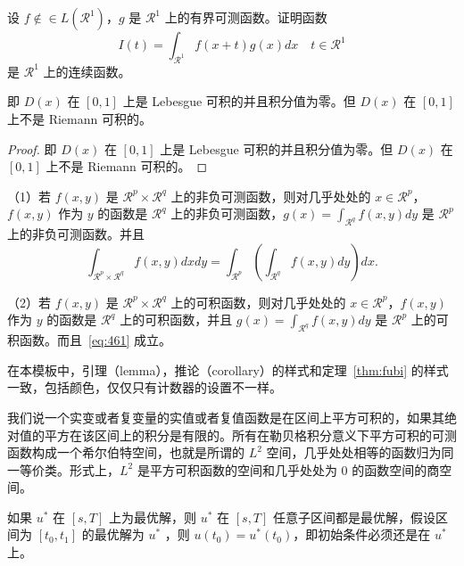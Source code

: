 \documentclass[math,logic,quote,code,mode=simple]{codedumpnote}
\begin{document}
\begin{exercise}\label{exer:43}
设 $f \notin\in L(\mathcal{R}^1)$，$g$ 是 $\mathcal{R}^1$ 上的有界可测函数。证明函数
\begin{equation}
   \label{ex:1}
   I(t) = \int_{\mathcal{R}^1} f(x+t)g(x)dx \quad t \in \mathcal{R}^1
\end{equation}
是 $\mathcal{R}^1$ 上的连续函数。 
\end{exercise}

\begin{solution}
即 $D(x)$ 在 $[0,1]$ 上是 Lebesgue 可积的并且积分值为零。但 $D(x)$ 在 $[0,1]$ 上不是 Riemann 可积的。
\end{solution}

\begin{proof}
即 $D(x)$ 在 $[0,1]$ 上是 Lebesgue 可积的并且积分值为零。但 $D(x)$ 在 $[0,1]$ 上不是 Riemann 可积的。
\end{proof}

\begin{theorem}[Fubini 定理] \label{thm:fubi} 
（1）若 $f(x,y)$ 是 $\mathcal{R}^p\times\mathcal{R}^q$ 上的非负可测函数，则对几乎处处的 $x\in \mathcal{R}^p$，$f(x,y)$ 作为 $y$ 的函数是 $\mathcal{R}^q$ 上的非负可测函数，$g(x)=\int_{\mathcal{R}^q}f(x,y) dy$ 是 $\mathcal{R}^p$ 上的非负可测函数。并且
\begin{equation}
   \label{eq:461}
   \int_{\mathcal{R}^p\times\mathcal{R}^q} f(x,y) dxdy=\int_{\mathcal{R}^p}\left(\int_{\mathcal{R}^q}f(x,y)dy\right)dx.
\end{equation}

（2）若 $f(x,y)$ 是 $\mathcal{R}^p\times\mathcal{R}^q$ 上的可积函数，则对几乎处处的 $x\in\mathcal{R}^p$，$f(x,y)$ 作为 $y$ 的函数是 $\mathcal{R}^q$ 上的可积函数，并且 $g(x)=\int_{\mathcal{R}^q}f(x,y) dy$ 是 $\mathcal{R}^p$ 上的可积函数。而且~\eqref{eq:461} 成立。
\end{theorem}

\begin{note}
在本模板中，引理（lemma），推论（corollary）的样式和定理~\ref{thm:fubi} 的样式一致，包括颜色，仅仅只有计数器的设置不一样。
\end{note}


我们说一个实变或者复变量的实值或者复值函数是在区间上平方可积的，如果其绝对值的平方在该区间上的积分是有限的。所有在勒贝格积分意义下平方可积的可测函数构成一个希尔伯特空间，也就是所谓的 $L^2$ 空间，几乎处处相等的函数归为同一等价类。形式上，$L^2$ 是平方可积函数的空间和几乎处处为 0 的函数空间的商空间。

\begin{proposition}[最优性原理] \label{pro:max}
如果 $u^*$ 在 $[s,T]$ 上为最优解，则 $u^*$ 在 $[s, T]$ 任意子区间都是最优解，假设区间为 $[t_0, t_1]$ 的最优解为 $u^*$ ，则 $u(t_0)=u^{*}(t_0)$，即初始条件必须还是在 $u^*$ 上。
\end{proposition}
\end{document}
